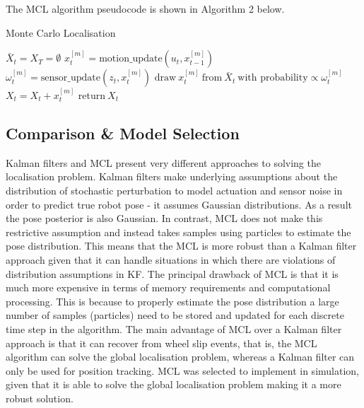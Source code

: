 \documentclass[a4paper]{article}
\begin{document}
The MCL algorithm pseudocode is shown in Algorithm 2 below.
\begin{algorithm}
\caption{Monte Carlo Localisation}
\begin{algorithmic}[1]
\State $\bar{X}_t = X_T = \emptyset$
	\State $x^{[m]}_t = \text{motion\_update}(u_t, x^{[m]}_{t-1})$
	\State $\omega^{[m]}_t = \text{sensor\_update}(z_t, x^{[m]}_t)$
\EndFor
{}
	\State $\text{draw} \ x^{[m]}_t \ \text{from} \  \bar{X}_t \ \text{with probability} \propto \omega^{[m]}_t$
	\State $X_t = X_t + x^{[m]}_t$
\EndFor
\State $\text{return} \ X_t$
\EndProcedure
\end{algorithmic}
\end{algorithm}

\subsection{Comparison \& Model Selection}
Kalman filters and MCL present very different approaches to solving the localisation problem. Kalman filters make underlying assumptions about the distribution of stochastic perturbation to model actuation and sensor noise in order to predict true robot pose - it assumes Gaussian distributions. As a result the pose posterior is also Gaussian. In contrast, MCL does not make this restrictive assumption and instead takes samples using particles to estimate the pose distribution. This means that the MCL is more robust than a Kalman filter approach given that it can handle situations in which there are violations of distribution assumptions in KF. The principal drawback of MCL is that it is much more expensive in terms of memory requirements and computational processing. This is because to properly estimate the pose distribution a large number of samples (particles) need to be stored and updated for each discrete time step in the algorithm. The main advantage of MCL over a Kalman filter approach is that it can recover from wheel slip events, that is, the MCL algorithm can solve the global localisation problem, whereas a Kalman filter can only be used for position tracking. MCL was selected to implement in simulation, given that it is able to solve the global localisation problem making it a more robust solution.

\newpage
\end{document}
